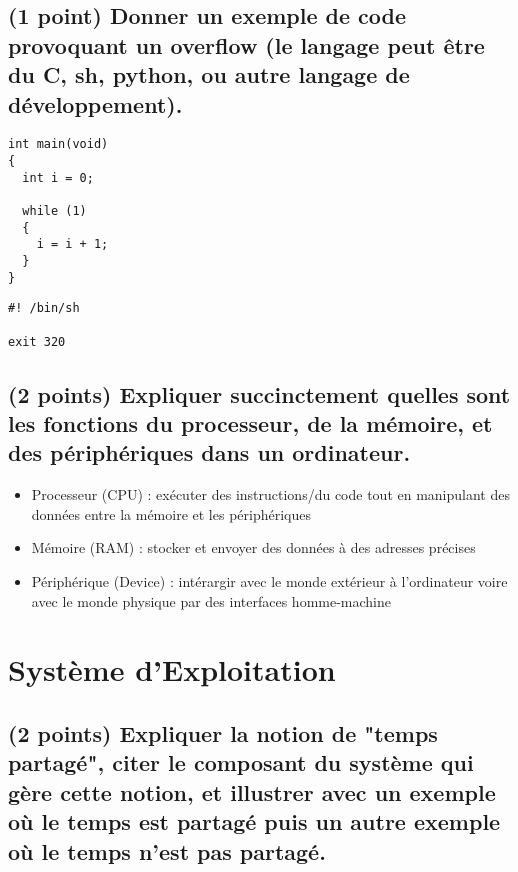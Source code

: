 \documentclass[11pt,a4paper]{article}
\begin{document}
\subsection{(1 point) Donner un exemple de code provoquant un overflow (le langage peut être du C, sh, python, ou autre langage de développement).}

\bigskip
\lstset{language=c}
\begin{lstlisting}[frame=single,title={overflow.c}]
int main(void)
{
  int i = 0;
  
  while (1)
  {
    i = i + 1;
  }
}
\end{lstlisting}
\bigskip

\lstset{language=c}
\begin{lstlisting}[frame=single,title={overflow.sh}]
#! /bin/sh

exit 320
\end{lstlisting}
\bigskip

\subsection{(2 points) Expliquer succinctement quelles sont les fonctions du processeur, de la mémoire, et des périphériques dans un ordinateur.}

\bigskip
\begin{itemize}
\item Processeur (CPU) : exécuter des instructions/du code tout en manipulant des données entre la mémoire et les périphériques
\item Mémoire (RAM) : stocker et envoyer des données à des adresses précises
\item Périphérique (Device) : intérargir avec le monde extérieur à l'ordinateur voire avec le monde physique par des interfaces homme-machine
\end{itemize}
\bigskip

\section{Système d'Exploitation} %

\subsection{(2 points) Expliquer la notion de "temps partagé", citer le composant du système qui gère cette notion, et illustrer avec un exemple où le temps est partagé puis un autre exemple où le temps n'est pas partagé.}
\end{document}
